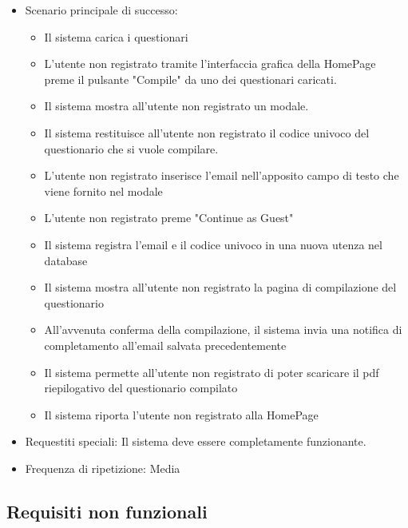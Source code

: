 \documentclass[12pt]{article}
\begin{document}
\begin{itemize}
\item Scenario principale di successo: 
\begin{itemize}
	\item Il sistema carica i questionari
	\item L'utente non registrato tramite l'interfaccia grafica della HomePage preme il pulsante "Compile" da uno dei questionari caricati.
\item Il sistema mostra all'utente non registrato un modale.
\item Il sistema restituisce all'utente non registrato il codice univoco del questionario che si vuole compilare.
\item L'utente non registrato inserisce l'email nell'apposito campo di testo che viene fornito nel modale
\item L'utente non registrato preme "Continue as Guest"
\item Il sistema registra l'email e il codice univoco in una nuova utenza nel database
\item Il sistema mostra all'utente non registrato la pagina di compilazione del questionario
\item All'avvenuta conferma della compilazione, il sistema invia una notifica di completamento all'email salvata precedentemente
\item Il sistema permette all'utente non registrato di poter scaricare il pdf riepilogativo del questionario compilato
\item Il sistema riporta l'utente non registrato alla HomePage
\end{itemize}
\end{itemize}
\begin{itemize}
\item Requestiti speciali: Il sistema deve essere completamente funzionante.
\end{itemize}
\begin{itemize}
\item Frequenza di ripetizione: Media
\end{itemize}

\subsection{Requisiti non funzionali}
\end{document}
